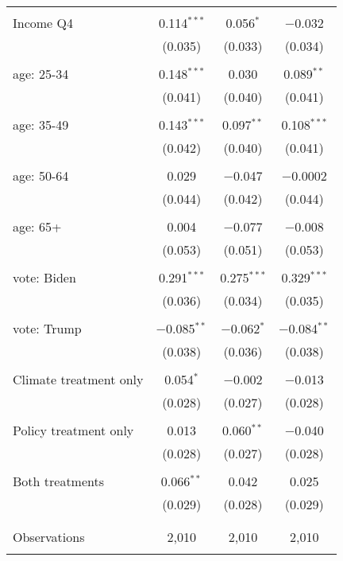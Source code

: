 \begin{tabular}{@{\extracolsep{5pt}}lccc}
  & & & \\ 
 Income Q4 & 0.114$^{***}$ & 0.056$^{*}$ & $-$0.032 \\ 
  & (0.035) & (0.033) & (0.034) \\ 
  & & & \\ 
 age: 25-34 & 0.148$^{***}$ & 0.030 & 0.089$^{**}$ \\ 
  & (0.041) & (0.040) & (0.041) \\ 
  & & & \\ 
 age: 35-49 & 0.143$^{***}$ & 0.097$^{**}$ & 0.108$^{***}$ \\ 
  & (0.042) & (0.040) & (0.041) \\ 
  & & & \\ 
 age: 50-64 & 0.029 & $-$0.047 & $-$0.0002 \\ 
  & (0.044) & (0.042) & (0.044) \\ 
  & & & \\ 
 age: 65+ & 0.004 & $-$0.077 & $-$0.008 \\ 
  & (0.053) & (0.051) & (0.053) \\ 
  & & & \\ 
 vote: Biden & 0.291$^{***}$ & 0.275$^{***}$ & 0.329$^{***}$ \\ 
  & (0.036) & (0.034) & (0.035) \\ 
  & & & \\ 
 vote: Trump & $-$0.085$^{**}$ & $-$0.062$^{*}$ & $-$0.084$^{**}$ \\ 
  & (0.038) & (0.036) & (0.038) \\ 
  & & & \\ 
 Climate treatment only & 0.054$^{*}$ & $-$0.002 & $-$0.013 \\ 
  & (0.028) & (0.027) & (0.028) \\ 
  & & & \\ 
 Policy treatment only & 0.013 & 0.060$^{**}$ & $-$0.040 \\ 
  & (0.028) & (0.027) & (0.028) \\ 
  & & & \\ 
 Both treatments & 0.066$^{**}$ & 0.042 & 0.025 \\ 
  & (0.029) & (0.028) & (0.029) \\ 
  & & & \\ 
\hline \\[-1.8ex] 

Observations & 2,010 & 2,010 & 2,010 \\ 
\hline 
\hline \\[-1.8ex] 
\end{tabular} 